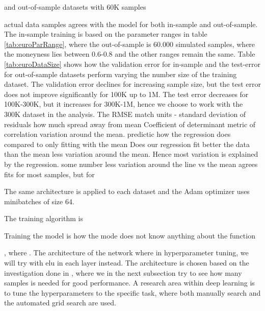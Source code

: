 
and out-of-sample datasets with 60K samples

actual data samples agrees with the model for both in-sample and out-of-sample. The in-sample training is based on the parameter ranges in table \ref{tab:euroParRange}, where the out-of-sample is 60.000 simulated samples, where the moneyness lies between 0.6-0.8 and the other ranges remain the same.  Table \ref{tab:euroDataSize} shows how the validation error for in-sample and the test-error for out-of-sample datasets perform varying the number size of the training dataset. The validation error declines for increasing sample size, but the test error does not improve significantly for 100K up to 1M. The test error decreases for 100K-300K, but it increases for 300K-1M, hence we choose to work with the 300K dataset in the analysis. The 
RMSE match units - standard deviation of residuals how much spread away from mean
Coefficient of determinant metric of correlation
variation around the mean.
predictic how the regression does compared to only fitting with the mean
Does our regression fit better the data than the mean
less variation around the mean. Hence most variation is explained by the regression. some number less variation around the line vs the mean
agrees fits for most samples, but for 



The same architecture is applied to each dataset and the Adam optimizer uses minibatches of size 64.

The training algorithm is 


Training the model is how the mode
does not know anything about the function





 , where . The architecture of the network  where in hyperparameter tuning, we will try with elu in each layer instead. The architecture is chosen based on the investigation done in  \parencite{HirsaAli2019}, where we in the next subsection try to see how many samples is needed for good performance. A research area within deep learning is to tune the hyperparameters to the specific task, where both manually search and the automated grid search are used. 

